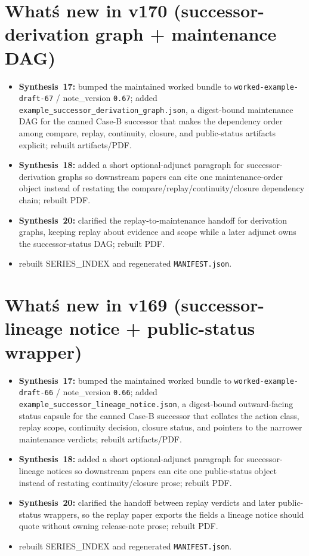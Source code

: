 \documentclass[11pt]{article}
\begin{document}
\section{What\'s new in v170 (successor-derivation graph + maintenance DAG)}
\begin{itemize}[leftmargin=*]
\item \textbf{Synthesis~17:} bumped the maintained worked bundle to \texttt{worked-example-draft-67} / note\_version \texttt{0.67}; added \texttt{example\_successor\_derivation\_graph.json}, a digest-bound maintenance DAG for the canned Case-B successor that makes the dependency order among compare, replay, continuity, closure, and public-status artifacts explicit; rebuilt artifacts/PDF.
\item \textbf{Synthesis~18:} added a short optional-adjunct paragraph for successor-derivation graphs so downstream papers can cite one maintenance-order object instead of restating the compare/replay/continuity/closure dependency chain; rebuilt PDF.
\item \textbf{Synthesis~20:} clarified the replay-to-maintenance handoff for derivation graphs, keeping replay about evidence and scope while a later adjunct owns the successor-status DAG; rebuilt PDF.
\item rebuilt SERIES\_INDEX and regenerated \texttt{MANIFEST.json}.
\end{itemize}

\section{What\'s new in v169 (successor-lineage notice + public-status wrapper)}
\begin{itemize}[leftmargin=*]
\item \textbf{Synthesis~17:} bumped the maintained worked bundle to \texttt{worked-example-draft-66} / note\_version \texttt{0.66}; added \texttt{example\_successor\_lineage\_notice.json}, a digest-bound outward-facing status capsule for the canned Case-B successor that collates the action class, replay scope, continuity decision, closure status, and pointers to the narrower maintenance verdicts; rebuilt artifacts/PDF.
\item \textbf{Synthesis~18:} added a short optional-adjunct paragraph for successor-lineage notices so downstream papers can cite one public-status object instead of restating continuity/closure prose; rebuilt PDF.
\item \textbf{Synthesis~20:} clarified the handoff between replay verdicts and later public-status wrappers, so the replay paper exports the fields a lineage notice should quote without owning release-note prose; rebuilt PDF.
\item rebuilt SERIES\_INDEX and regenerated \texttt{MANIFEST.json}.
\end{itemize}
\end{document}
